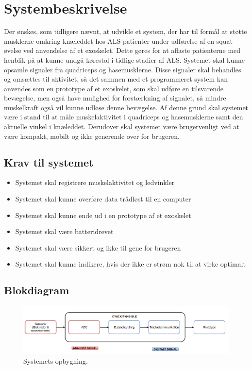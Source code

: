 \section{Systembeskrivelse}
Der ønskes, som tidligere nævnt, at udvikle et system, der har til formål at støtte musklerne omkring knæleddet hos ALS-patienter under udførelse af en squat-øvelse ved anvendelse af et exoskelet. Dette gøres for at aflaste patienterne med henblik på at kunne undgå kørestol i tidlige stadier af ALS. Systemet skal kunne opsamle signaler fra quadriceps og hasemusklerne. Disse signaler skal behandles og omsættes til aktivitet, så det sammen med et programmeret system kan anvendes som en prototype af et exoskelet, som skal udføre en tilsvarende bevægelse, men også have mulighed for forstærkning af signalet, så mindre muskelkraft også vil kunne udløse denne bevægelse. Af denne grund skal systemet være i stand til at måle muskelaktivitet i quadriceps og hasemusklerne samt den aktuelle vinkel i knæleddet. Derudover skal systemet være brugervenligt ved at være kompakt, mobilt og ikke generende over for brugeren.

\subsection{Krav til systemet} 
\begin{itemize}
\item Systemet skal registrere muskelaktivitet og ledvinkler
\item Systemet skal kunne overføre data trådløst til en computer
\item Systemet skal kunne ende ud i en prototype af et exoskelet
\item Systemet skal være batteridrevet
\item Systemet skal være sikkert og ikke til gene for brugeren
\item Systemet skal kunne indikere, hvis der ikke er strøm nok til at virke optimalt
\end{itemize}


\subsection{Blokdiagram}
\begin{figure}[H]
\centering
\includegraphics[width=1\textwidth]{figures/blokdiagram.png}
\caption{Systemets opbygning.}
\label{fig:blokdiagram}
\end{figure}


